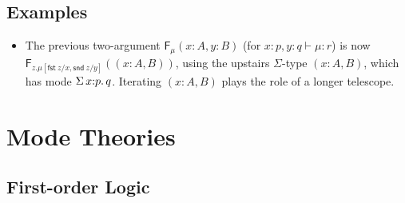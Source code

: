 \documentclass[10pt]{article}
\theoremstyle{definition}
\newcommand\dsd[1]{\ensuremath{\mathsf{#1}}}
\newcommand\F[2]{\ensuremath{\mathsf{F}_{#1}(#2)}}
\newcommand{\app}[2]{\ensuremath{#1 \: #2}}
\newcommand{\sigmacl}[3]{\ensuremath{\textnormal{$\Sigma$}\,#1{:}#2.\,#3}}
\newcommand{\fst}[1]{\app{\dsd{fst}}{#1}}
\newcommand{\snd}[1]{\app{\dsd{snd}}{#1}}
\newcommand{\telety}[3]{\ensuremath{(#1{:}#2,#3)}}
\begin{document}
\subsection{Examples}

\begin{itemize}
\item 
The previous two-argument \F{\mu}{x:A,y:B} (for $x :p, y:q \vdash \mu :
r$) is now \F{z.\mu[\fst z/x,\snd z/y]}{\telety{x}{A}{B}}, using the
upstairs $\Sigma$-type ${\telety{x}{A}{B}}$, which has mode
$\sigmacl{x}{p}{q}$.  Iterating $\telety{x}{A}{B}$ plays the role of a
longer telescope.  
\end{itemize}

\section{Mode Theories}

\subsection{First-order Logic}
\end{document}
